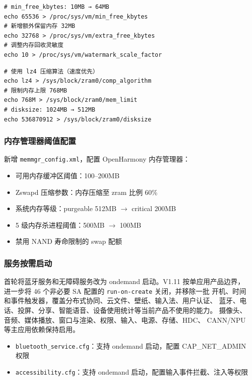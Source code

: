 \begin{lstlisting}[style=shell, caption={VM 参数调优}]
# min_free_kbytes: 10MB → 64MB
echo 65536 > /proc/sys/vm/min_free_kbytes
# 新增额外保留内存 32MB
echo 32768 > /proc/sys/vm/extra_free_kbytes
# 调整内存回收灵敏度
echo 10 > /proc/sys/vm/watermark_scale_factor
\end{lstlisting}

\begin{lstlisting}[style=shell, caption={ZRAM 优化}]
# 使用 lz4 压缩算法（速度优先）
echo lz4 > /sys/block/zram0/comp_algorithm
# 限制内存上限 768MB
echo 768M > /sys/block/zram0/mem_limit
# disksize: 1024MB → 512MB
echo 536870912 > /sys/block/zram0/disksize
\end{lstlisting}

\subsubsection{内存管理器阈值配置}

新增 \texttt{memmgr\_config.xml}，配置 OpenHarmony 内存管理器：

\begin{itemize}
  \item 可用内存缓冲区阈值：100--200MB
  \item Zswapd 压缩参数：内存压缩至 zram 比例 60\%
  \item 系统内存等级：purgeable 512MB $\rightarrow$ critical 200MB
  \item 5 级内存杀进程阈值：500MB $\rightarrow$ 100MB
  \item 禁用 NAND 寿命限制的 swap 配额
\end{itemize}

\subsubsection{服务按需启动}

首轮将蓝牙服务和无障碍服务改为 ondemand 启动。V1.11 按单应用产品边界，
进一步将 46 个非必要 SA 配置的 \texttt{run-on-create} 关闭，并移除一批
开机、时间和事件触发器，覆盖分布式协同、云文件、壁纸、输入法、用户认证、
蓝牙、电话、投屏、分享、智能语音、设备使用统计等当前产品不使用的能力。
摄像头、音频、媒体播放、窗口与渲染、权限、输入、电源、存储、HDC、
CANN/NPU 等主应用依赖保持启用。

\begin{itemize}
  \item \texttt{bluetooth\_service.cfg}：支持 ondemand 启动，配置 CAP\_NET\_ADMIN 权限
  \item \texttt{accessibility.cfg}：支持 ondemand 启动，配置输入事件拦截、注入等权限
\end{itemize}

